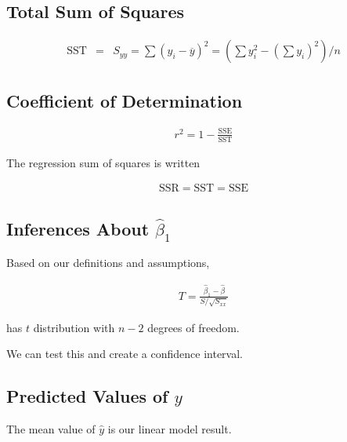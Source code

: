     \subsection{Total Sum of Squares}
    \begin{equation*}
        \begin{aligned}
            \text{SST} &=& S_{yy} = \sum\left( y_i - \overline{y} \right)^2 = \left(\sum y_i^2 - \left( \sum y_i \right)^2
            \right) / n
        \end{aligned}
    \end{equation*}

    \subsection{Coefficient of Determination}

    \begin{equation*}
        \begin{aligned}
            r^2 = 1 - \frac{\text{SSE}}{\text{SST}}
        \end{aligned}
    \end{equation*}

    The regression sum of squares is written

    \begin{equation*}
        \begin{aligned}
            \text{SSR} = \text{SST} = \text{SSE}
        \end{aligned}
    \end{equation*}

    \subsection{Inferences About $\hat{\beta}_1$}
    Based on our definitions and assumptions,

    \begin{equation*}
        \begin{aligned}
            T = \frac{\hat{\beta}_1 - \hat{\beta}}{S / \sqrt{S_{xx}}}
        \end{aligned}
    \end{equation*}

    has $t$ distribution with $n - 2$ degrees of freedom.

    We can test this and create a confidence interval.

    \subsection{Predicted Values of $y$}
    The mean value of $\hat{y}$ is our linear model result.

